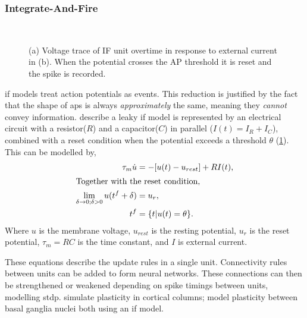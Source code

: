\subsubsection{Integrate-And-Fire}
\begin{figure}[ht]
	\centering
	\begin{subfigure}[t]{0.48\textwidth}
		\centering
		\caption{}
		
		\label{fig:ifu}
	\end{subfigure}
	~
	\begin{subfigure}[t]{0.48\textwidth}
		\centering
		\caption{}
		
	\end{subfigure}
	\caption{(a) Voltage trace of IF unit overtime in response to external current in (b). When the potential crosses
		the AP threshold it is reset and the spike is recorded.}
\end{figure}

\acrshort{if} models treat action potentials as events.
This reduction is justified by the fact that the shape of \acrshort{ap}s is always \textit{approximately}
the same, meaning they \textit{cannot} convey information. \cite{gerstner2014if} describe a leaky \acrshort{if} model
is represented by an electrical circuit with a resistor($R$) and a capacitor($C$) in parallel
($I(t) = I_R + I_C$), combined with a reset condition when the potential exceeds a threshold
$\theta$ (\cref{fig:ifu}).
This can be modelled by,
\begin{align}
	\tau_m \dot u                                           & = -[u(t) - u_{rest}] + RI(t),                                    \\
	\intertext{Together with the reset condition,}
	\lim_{\delta \rightarrow 0; \delta > 0} u(t^f + \delta) & = u_r,                                                           \\
	t^f                                                     & = \{t | u(t)                                        = \theta \}.
\end{align}
Where $u$ is the membrane voltage, $u_{rest}$ is the resting potential, $u_r$ is the reset
potential, $\tau_m = RC$ is the time constant, and $I$ is external current.

These equations describe the update rules in a single unit. Connectivity rules between units
can be added to form neural networks. These connections can then be strengthened or weakened
depending on spike timings between units, modelling \acrshort{stdp}. \cite{shupe2021integrate} simulate
plasticity in cortical columns; \cite{kromer2023synaptic} model plasticity between basal ganglia
nuclei both using an \acrshort{if} model.

